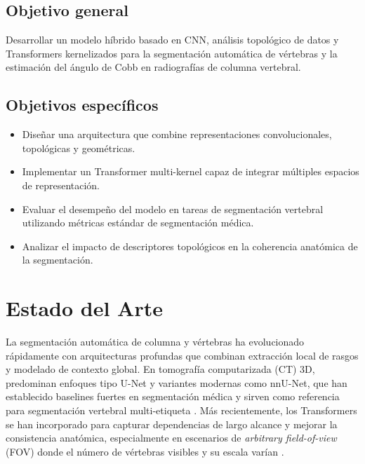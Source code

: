 \documentclass[conference]{IEEEtran}
\begin{document}
\subsection{Objetivo general}

Desarrollar un modelo híbrido basado en CNN, análisis topológico de datos y Transformers kernelizados para la segmentación automática de vértebras y la estimación del ángulo de Cobb en radiografías de columna vertebral.

\subsection{Objetivos específicos}

\begin{itemize}

\item Diseñar una arquitectura que combine representaciones convolucionales, topológicas y geométricas.

\item Implementar un Transformer multi-kernel capaz de integrar múltiples espacios de representación.

\item Evaluar el desempeño del modelo en tareas de segmentación vertebral utilizando métricas estándar de segmentación médica.

\item Analizar el impacto de descriptores topológicos en la coherencia anatómica de la segmentación.

\end{itemize}

\section{Estado del Arte}
\label{sec:sota}

La segmentación automática de columna y vértebras ha evolucionado rápidamente con arquitecturas profundas que combinan extracción local de rasgos y modelado de contexto global. En tomografía computarizada (CT) 3D, predominan enfoques tipo U-Net y variantes modernas como nnU-Net, que han establecido baselines fuertes en segmentación médica y sirven como referencia para segmentación vertebral multi-etiqueta \cite{ronneberger2015unet,isensee2021nnunet}. Más recientemente, los Transformers se han incorporado para capturar dependencias de largo alcance y mejorar la consistencia anatómica, especialmente en escenarios de \emph{arbitrary field-of-view} (FOV) donde el número de vértebras visibles y su escala varían \cite{tao2022spine_transformers,you2023verteformer,zhang2023swinspine,li2024verformer}.
\end{document}
